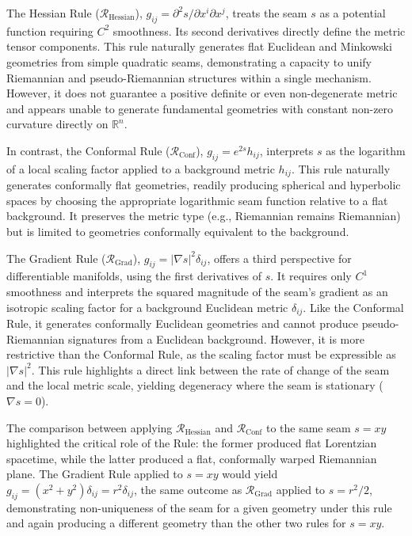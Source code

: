 \documentclass[twoside,twocolumn]{article}
\begin{document}
The Hessian Rule ($\mathcal{R}_{\text{Hessian}}$), $g_{ij} = \partial^2 s / \partial x^i \partial x^j$, treats the seam $s$ as a potential function requiring $C^2$ smoothness. Its second derivatives directly define the metric tensor components. This rule naturally generates flat Euclidean and Minkowski geometries from simple quadratic seams, demonstrating a capacity to unify Riemannian and pseudo-Riemannian structures within a single mechanism. However, it does not guarantee a positive definite or even non-degenerate metric and appears unable to generate fundamental geometries with constant non-zero curvature directly on $\mathbb{R}^n$.

In contrast, the Conformal Rule ($\mathcal{R}_{\text{Conf}}$), $g_{ij} = e^{2s} h_{ij}$, interprets $s$ as the logarithm of a local scaling factor applied to a background metric $h_{ij}$. This rule naturally generates conformally flat geometries, readily producing spherical and hyperbolic spaces by choosing the appropriate logarithmic seam function relative to a flat background. It preserves the metric type (e.g., Riemannian remains Riemannian) but is limited to geometries conformally equivalent to the background.

The Gradient Rule ($\mathcal{R}_{\text{Grad}}$), $g_{ij} = |\nabla s|^2 \delta_{ij}$, offers a third perspective for differentiable manifolds, using the first derivatives of $s$. It requires only $C^1$ smoothness and interprets the squared magnitude of the seam's gradient as an isotropic scaling factor for a background Euclidean metric $\delta_{ij}$. Like the Conformal Rule, it generates conformally Euclidean geometries and cannot produce pseudo-Riemannian signatures from a Euclidean background. However, it is more restrictive than the Conformal Rule, as the scaling factor must be expressible as $|\nabla s|^2$. This rule highlights a direct link between the rate of change of the seam and the local metric scale, yielding degeneracy where the seam is stationary ($\nabla s = 0$).

The comparison between applying $\mathcal{R}_{\text{Hessian}}$ and $\mathcal{R}_{\text{Conf}}$ to the same seam $s=xy$ highlighted the critical role of the Rule: the former produced flat Lorentzian spacetime, while the latter produced a flat, conformally warped Riemannian plane. The Gradient Rule applied to $s=xy$ would yield $g_{ij} = (x^2+y^2)\delta_{ij} = r^2 \delta_{ij}$, the same outcome as $\mathcal{R}_{\text{Grad}}$ applied to $s=r^2/2$, demonstrating non-uniqueness of the seam for a given geometry under this rule and again producing a different geometry than the other two rules for $s=xy$.
\end{document}
